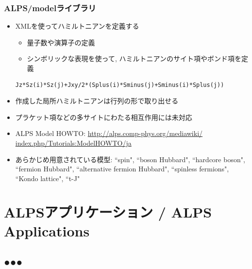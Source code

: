 \begin{frame}[t,fragile]
  \frametitle{ALPS/modelライブラリ}
  \begin{itemize}
  \item XMLを使ってハミルトニアンを定義する
    \begin{itemize}  
    \item 量子数や演算子の定義
    \item シンボリックな表現を使って, ハミルトニアンのサイト項やボンド項を定義
    \end{itemize}
    \begin{lstlisting}
Jz*Sz(i)*Sz(j)+Jxy/2*(Splus(i)*Sminus(j)+Sminus(i)*Splus(j))
\end{lstlisting}
  \item 作成した局所ハミルトニアンは行列の形で取り出せる
  \item プラケット項などの多サイトにわたる相互作用には未対応
  \item ALPS Model HOWTO: {\small \href{http://alps.comp-phys.org/mediawiki/index.php/Tutorials:ModelHOWTO/ja}{http://alps.comp-phys.org/mediawiki/ index.php/Tutorials:ModelHOWTO/ja}}
  \item あらかじめ用意されている模型: ``spin", ``boson Hubbard", ``hardcore boson", ``fermion Hubbard", ``alternative fermion Hubbard", ``spinless fermions", ``Kondo lattice", ``t-J"
  \end{itemize}
\end{frame}



\section{ALPSアプリケーション / ALPS Applications}
\subsection*{{\protect\color{red}●}{\protect\color{blue}●}{\protect\color{green}●}}

